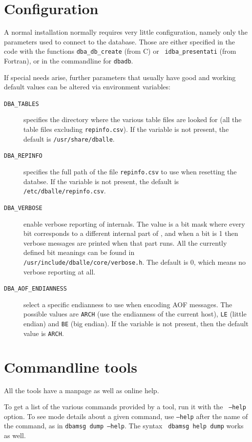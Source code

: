 \section {Configuration}

A normal \dballe{} installation normally requires very little configuration,
namely only the parameters used to connect to the database.  Those are either
specified in the code with the functions {\tt dba\_db\_create} (from C) or {\tt
idba\_presentati} (from Fortran), or in the commandline for {\tt dbadb}.

If special needs arise, further parameters that usually have good and working
default values can be altered via environment variables:

\begin{description}
\item[{\tt DBA\_TABLES}]
  specifies the directory where the various table files are looked for (all the
  table files excluding {\tt repinfo.csv}).  If the variable is not present,
  the default is {\tt /usr/share/dballe}.
\item[{\tt DBA\_REPINFO}]
  specifies the full path of the file {\tt repinfo.csv} to use when resetting
  the databse.  If the variable is not present, the default is
  {\tt /etc/dballe/repinfo.csv}.
\item[{\tt DBA\_VERBOSE}]
  enable verbose reporting of \dballe{} internals.  The value is a bit mask
  where every bit corresponds to a different internal part of \dballe{}, and
  when a bit is 1 then verbose messages are printed when that part runs.  All
  the currently defined bit meanings can be found in
  {\tt /usr/include/dballe/core/verbose.h}.  The default is 0, which means no
  verbose reporting at all.
\item[{\tt DBA\_AOF\_ENDIANNESS}]
  select a specific endianness to use when encoding AOF messages.  The possible
  values are {\tt ARCH} (use the endianness of the current host), {\tt LE}
  (little endian) and {\tt BE} (big endian).  If the variable is not present,
  then the default value is {\tt ARCH}.
\end{description}


\section {Commandline tools}

All the tools have a manpage as well as online help.

To get a list of the various commands provided by a tool, run it with the {\tt
--help} option.  To see mode details about a given command, use {\tt --help}
after the name of the command, as in {\tt dbamsg dump --help}.  The syntax {\tt
dbamsg help dump} works as well.


